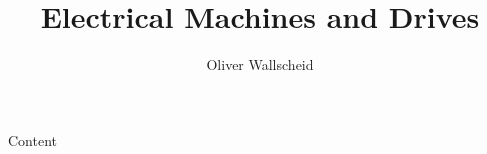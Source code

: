 \documentclass{../course_template/lectureClass}
\begin{document}

\title[Electrical Machines and Drives]{Electrical Machines and Drives}
\author{Oliver Wallscheid}
\date{}
\begin{frame}[plain]
    \titlepage
\end{frame}

\begin{frame}{Content}
    \tableofcontents
\end{frame}


%

\end{document}
